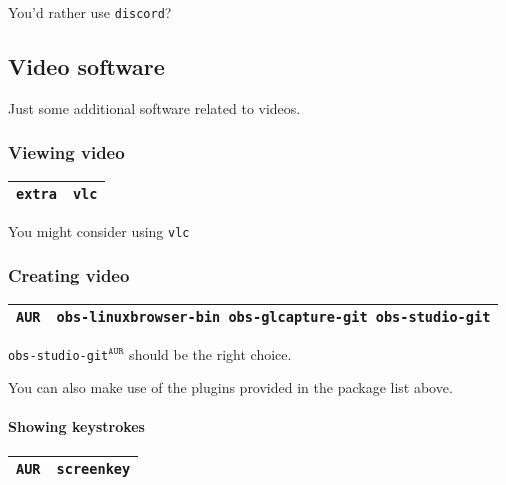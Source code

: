 \documentclass[9pt]{report}
\begin{document}
You’d rather use \texttt{discord}?



\vfill\eject

\hypertarget{x-video-software}{\subsection{Video software}}
Just some additional software related to videos.



\vfill\eject

\hypertarget{x-viewing-video}{\subsubsection{Viewing video}}
\begin{center}
\begin{tabular}{|c|c|}
\hline
\texttt{extra} & \texttt{vlc} \\ 
\hline
\end{tabular}
\end{center}

You might consider using \texttt{vlc}



\vfill\eject

\hypertarget{x-creating-video}{\subsubsection{Creating video}}
\begin{center}
\begin{tabular}{|c|c|}
\hline
\texttt{AUR} & \texttt{obs-linuxbrowser-bin obs-glcapture-git obs-studio-git} \\ 
\hline
\end{tabular}
\end{center}

\texttt{obs-studio-git}${}^{\texttt{AUR}}$ should be the right choice.


You can also make use of the plugins provided in the package list above.



\vfill\eject

\hypertarget{x-showing-keystrokes}{\paragraph{Showing keystrokes}}
\begin{center}
\begin{tabular}{|c|c|}
\hline
\texttt{AUR} & \texttt{screenkey} \\ 
\hline
\end{tabular}
\end{center}
\end{document}
